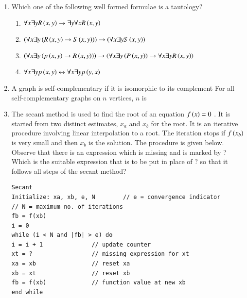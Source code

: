 \documentclass[journal,12pt,onecolumn]{IEEEtran}
\theoremstyle{remark}
\begin{document}
\begin{enumerate}
		\hfill{}
		
		\item Which one of the following well formed formulae is a tautology?
		
		\hfill{}
		
		\begin{enumerate}
			\item $\forall x \exists y R\left(x, y\right) \rightarrow \exists y \forall x R\left(x, y\right)$
			\item $\left(\forall x \exists y \left(R\left(x, y\right) \rightarrow S\left(x, y\right)\right)\right) \rightarrow \left(\forall x \exists yS\left(x, y\right)\right)$
			\item $\left(\forall x \exists y\left(p\left(x, y\right) \rightarrow R\left(x, y\right)\right)\right) \rightarrow \left(\forall x \exists y\left( P\left(x, y\right)\right) \rightarrow \forall x \exists y R\left(x, y\right)\right)$
			\item $\forall x \exists y p\left(x, y\right) \leftrightarrow \forall x \exists y p\left(y, x\right)$
		\end{enumerate}
		
		\item A graph is self-complementary if it is isomorphic to its complement For all self-complementary graphs on $n$ vertices, $n$ is
		
		\hfill{}
		
		\begin{enumerate}
		\end{enumerate}
		
		\item The secant method is used to find the root of an equation $f\left(x\right) = 0$ . It is started from two distinct estimates, $x_a$ and $x_b$ for the root. It is an iterative procedure involving linear interpolation to a root. The iteration stops if $f\left(x_b\right)$ is very small and then $x_b$ is the solution. The procedure is given below. Observe that there is an expression which is missing and is marked by ? Which is the suitable expression that is to be put in place of ? so that it follows all steps of the secant method?
		\begin{verbatim}
Secant
Initialize: xa, xb, e, N        // e = convergence indicator
// N = maximum no. of iterations
fb = f(xb)
i = 0
while (i < N and |fb| > e) do
i = i + 1              // update counter
xt = ?                 // missing expression for xt
xa = xb                // reset xa
xb = xt                // reset xb
fb = f(xb)             // function value at new xb
end while


\end{verbatim}
\end{enumerate}
\end{document}
